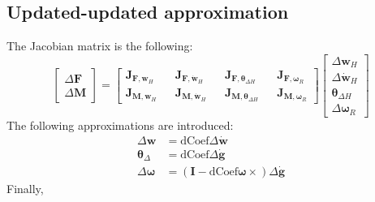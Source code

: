 \subsection{Updated-updated approximation}

The Jacobian matrix is the following:
\begin{equation}
    \begin{bmatrix}
        \Delta \mathbf{F} \\ \Delta \mathbf{M}
    \end{bmatrix} = \begin{bmatrix}
        \mathbf{J}_{\mathbf{F}, \mathbf{w}_H} && \mathbf{J}_{\mathbf{F}, \dot{\mathbf{w}}_H} && \mathbf{J}_{\mathbf{F}, \boldsymbol{\theta}_{\Delta H}} && \mathbf{J}_{\mathbf{F}, \boldsymbol{\omega}_R}\\
        \mathbf{J}_{\mathbf{M}, \mathbf{w}_H} && \mathbf{J}_{\mathbf{M}, \dot{\mathbf{w}}_H} && \mathbf{J}_{\mathbf{M}, \boldsymbol{\theta}_{\Delta H}} && \mathbf{J}_{\mathbf{M}, \boldsymbol{\omega}_R}
    \end{bmatrix}\begin{bmatrix}
        \Delta \mathbf{w}_H \\ \Delta {\dot{\mathbf{w}}}_H \\ \boldsymbol{\theta}_{\Delta H} \\ \Delta \boldsymbol{\omega}_R
    \end{bmatrix}
\end{equation}
The following approximations are introduced:
\begin{equation}
    \begin{split}
        \Delta \mathbf{w} &= \text{dCoef} \Delta {\dot{\mathbf{w}}}\\
        \boldsymbol{\theta}_{\Delta} &= \text{dCoef} \Delta {\dot{\mathbf{g}}}\\
        \Delta \boldsymbol{\omega} &= \left(\mathbf{I} - \text{dCoef}\boldsymbol{\omega}\times\right)\Delta {\dot{\mathbf{g}}}
    \end{split}
\end{equation}
Finally,
